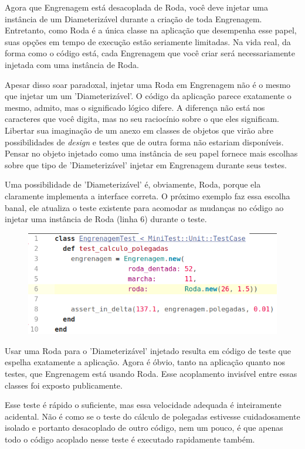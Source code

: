 Agora que Engrenagem está desacoplada de Roda, você deve injetar uma instância
de um Diameterizável durante a criação de toda Engrenagem. Entretanto, como
Roda é a única classe na aplicação que desempenha esse papel, suas opções em
tempo de execução estão seriamente limitadas. Na vida real, da forma como o
código está, cada Engrenagem que você criar será necessariamente injetada com uma
instância de Roda.

Apesar disso soar paradoxal, injetar uma Roda em Engrenagem não é o mesmo que
injetar um um 'Diameterizável'. O código da aplicação parece exatamente o mesmo,
admito, mas o significado lógico difere. A diferença não está nos caracteres
que você digita, mas no seu raciocínio sobre o que eles significam. Libertar sua
imaginação de um anexo em classes de objetos que virão abre possibilidades de
\textit{design} e testes que de outra forma não estariam disponíveis. Pensar no
objeto injetado como uma instância de seu papel fornece mais escolhas sobre
que tipo de 'Diameterizável' injetar em Engrenagem durante seus testes.

Uma possibilidade de 'Diameterizável' é, obviamente, Roda, porque ela claramente
implementa a interface correta. O próximo exemplo faz essa escolha banal, ele
atualiza o teste existente para acomodar as mudanças no código ao injetar uma
instância de Roda (linha 6) durante o teste.

\begin{figure}[!htbp]
  \center
  \includegraphics[scale=0.50]{imagens/codigo_pag_206.png}
  \label{img:codigo_pag_206}
\end{figure}

Usar uma Roda para o 'Diameterizável' injetado resulta em código
de teste que espelha exatamente a aplicação. Agora é óbvio,
tanto na aplicação quanto nos testes, que Engrenagem está usando
Roda. Esse acoplamento invisível entre essas classes foi exposto
publicamente.

Esse teste é rápido o suficiente, mas essa velocidade adequada é
inteiramente acidental. Não é como se o teste do cálculo de
polegadas estivesse cuidadosamente isolado e portanto
desacoplado de outro código, nem um pouco, é que apenas todo o
código acoplado nesse teste é executado rapidamente também.

